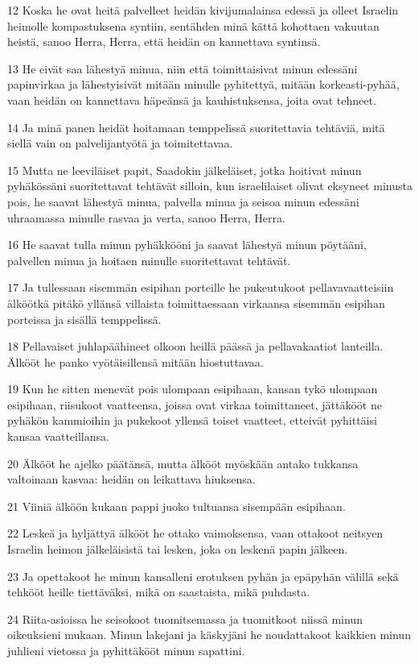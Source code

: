\par 12 Koska he ovat heitä palvelleet heidän kivijumalainsa edessä ja olleet Israelin heimolle kompastuksena syntiin, sentähden minä kättä kohottaen vakuutan heistä, sanoo Herra, Herra, että heidän on kannettava syntinsä.
\par 13 He eivät saa lähestyä minua, niin että toimittaisivat minun edessäni papinvirkaa ja lähestyisivät mitään minulle pyhitettyä, mitään korkeasti-pyhää, vaan heidän on kannettava häpeänsä ja kauhistuksensa, joita ovat tehneet.
\par 14 Ja minä panen heidät hoitamaan temppelissä suoritettavia tehtäviä, mitä siellä vain on palvelijantyötä ja toimitettavaa.
\par 15 Mutta ne leeviläiset papit, Saadokin jälkeläiset, jotka hoitivat minun pyhäkössäni suoritettavat tehtävät silloin, kun israelilaiset olivat eksyneet minusta pois, he saavat lähestyä minua, palvella minua ja seisoa minun edessäni uhraamassa minulle rasvaa ja verta, sanoo Herra, Herra.
\par 16 He saavat tulla minun pyhäkkööni ja saavat lähestyä minun pöytääni, palvellen minua ja hoitaen minulle suoritettavat tehtävät.
\par 17 Ja tullessaan sisemmän esipihan porteille he pukeutukoot pellavavaatteisiin älköötkä pitäkö yllänsä villaista toimittaessaan virkaansa sisemmän esipihan porteissa ja sisällä temppelissä.
\par 18 Pellavaiset juhlapäähineet olkoon heillä päässä ja pellavakaatiot lanteilla. Älkööt he panko vyötäisillensä mitään hiostuttavaa.
\par 19 Kun he sitten menevät pois ulompaan esipihaan, kansan tykö ulompaan esipihaan, riisukoot vaatteensa, joissa ovat virkaa toimittaneet, jättäkööt ne pyhäkön kammioihin ja pukekoot yllensä toiset vaatteet, etteivät pyhittäisi kansaa vaatteillansa.
\par 20 Älkööt he ajelko päätänsä, mutta älkööt myöskään antako tukkansa valtoinaan kasvaa: heidän on leikattava hiuksensa.
\par 21 Viiniä älköön kukaan pappi juoko tultuansa sisempään esipihaan.
\par 22 Leskeä ja hyljättyä älkööt he ottako vaimoksensa, vaan ottakoot neitsyen Israelin heimon jälkeläisistä tai lesken, joka on leskenä papin jälkeen.
\par 23 Ja opettakoot he minun kansalleni erotuksen pyhän ja epäpyhän välillä sekä tehkööt heille tiettäväksi, mikä on saastaista, mikä puhdasta.
\par 24 Riita-asioissa he seisokoot tuomitsemassa ja tuomitkoot niissä minun oikeuksieni mukaan. Minun lakejani ja käskyjäni he noudattakoot kaikkien minun juhlieni vietossa ja pyhittäkööt minun sapattini.
